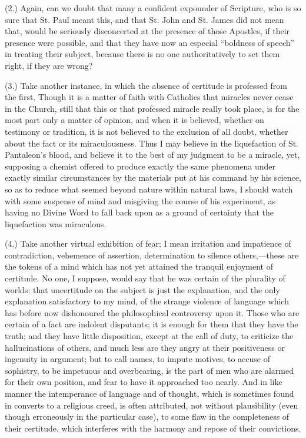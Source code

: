 (2.) Again, can we doubt that many a confident expounder of
Scripture, who is so sure that St. Paul meant this, and that St. John
and St. James did not mean that, would be seriously disconcerted at
the presence of those Apostles, if their presence were possible, and
that they have now an especial ``boldness of speech'' in
treating their subject, because there is no one authoritatively to set
them right, if they are wrong?

(3.) Take another instance, in which the absence of certitude
is professed from the first. Though it is a matter of faith with
Catholics that miracles never cease in the Church, still that this or
that professed miracle really took place, is for the most part only a
matter of opinion, and when it is believed, whether on testimony or
tradition, it is not believed to the exclusion of all doubt, whether
about the fact or its miraculousness. Thus I may believe in the
liquefaction of St. Pantaleon's blood, and believe it to the best of
my judgment to be a miracle, yet, supposing a chemist offered to
produce exactly the same phenomena under exactly similar circumstances
by the materials put at his command by his science, so as to reduce
what seemed beyond nature within natural laws, I should watch with
some suspense of mind and misgiving the course of his experiment, as
having no Divine Word to fall back upon as a ground of certainty that
the liquefaction was miraculous.

(4.) Take another virtual exhibition of fear; I mean irritation and
impatience of contradiction, vehemence of assertion, determination to
silence others,—these are the tokens of a mind which has not yet
attained the tranquil enjoyment of certitude. No one, I suppose, would
say that he was certain of the plurality of worlds: that uncertitude
on the subject is just the explanation, and the only explanation
satisfactory to my mind, of the strange violence of language which has
before now dishonoured the philosophical controversy upon it. Those
who are certain of a fact are indolent disputants; it is enough for
them that they have the truth; and they have little disposition,
except at the call of duty, to criticize the hallucinations of others,
and much less are they angry at their positiveness or ingenuity
in argument; but to call names, to impute motives, to accuse of
sophistry, to be impetuous and overbearing, is the part of men who are
alarmed for their own position, and fear to have it approached too
nearly. And in like manner the intemperance of language and of
thought, which is sometimes found in converts to a religious creed, is
often attributed, not without plausibility (even though erroneously in
the particular case), to some flaw in the completeness of their
certitude, which interferes with the harmony and repose of their
convictions.

